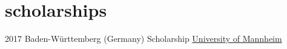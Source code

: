 \documentclass[hidelinks]{cv-style}          %
\begin{document}




\section{scholarships}

\begin{entrylist}




\entry
{2017}
{Baden-Württemberg (Germany) Scholarship}
{\href{https://www.wim.uni-mannheim.de/de/fakultaet/}{University of Mannheim}}



\end{entrylist}



\end{document}
